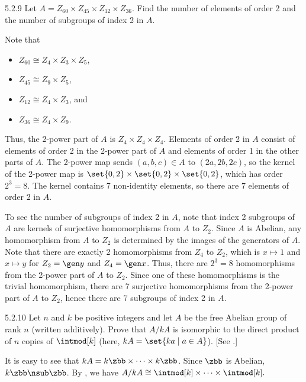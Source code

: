 \begin{exercise}{5.2.9}
    Let $A = Z_{60} \times Z_{45} \times Z_{12} \times Z_{36}$.
	Find the number of elements of order 2 and the number of subgroups of index 2 in $A$.
\end{exercise}

\begin{sol}
    Note that
    \begin{itemize}
        \item $Z_{60} \cong Z_4 \times Z_3 \times Z_5$,
        \item $Z_{45} \cong Z_9 \times Z_5$,
        \item $Z_{12} \cong Z_4 \times Z_3$, and
        \item $Z_{36} \cong Z_4 \times Z_9$.
    \end{itemize}
    Thus, the 2-power part of $A$ is $Z_4 \times Z_4 \times Z_4$.
	Elements of order 2 in $A$ consist of elements of order 2 in the 2-power part of $A$ and elements of order 1 in the other parts of $A$.
    The 2-power map sends $(a, b, c) \in A$ to $(2a, 2b, 2c)$, so the kernel of the 2-power map is $\set{0, 2} \times \set{0, 2} \times \set{0, 2}$, which has order $2^3 = 8$.
    The kernel contains 7 non-identity elements, so there are 7 elements of order 2 in $A$.

    To see the number of subgroups of index 2 in $A$, note that index 2 subgroups of $A$ are kernels of surjective homomorphisms from $A$ to $Z_2$.
    Since $A$ is Abelian, any homomorphism from $A$ to $Z_2$ is determined by the images of the generators of $A$.
    Note that there are exactly 2 homomorphisms from $Z_4$ to $Z_2$, which is $x \mapsto 1$ and $x \mapsto y$ for $Z_2 = \gen y$ and $Z_4 = \gen x$.
    Thus, there are $2^3 = 8$ homomorphisms from the 2-power part of $A$ to $Z_2$.
    Since one of these homomorphisms is the trivial homomorphism, there are 7 surjective homomorphisms from the 2-power part of $A$ to $Z_2$, hence there are 7 subgroups of index 2 in $A$.
\end{sol}

\begin{exercise}{5.2.10}
    Let $n$ and $k$ be positive integers and let $A$ be the free Abelian group of rank $n$ (written additively).
	Prove that $A/kA$ is isomorphic to the direct product of $n$ copies of $\intmod[k]$ (here, $kA = \set{ka \mid a \in A}$). [See .]
\end{exercise}

\begin{sol}
    It is easy to see that $kA = k\zbb \times \cdots \times k\zbb$.
	Since $\zbb$ is Abelian, $k\zbb \nsub \zbb$.
	By , we have $A/kA \cong \intmod[k] \times \cdots \times \intmod[k].$
\end{sol}

